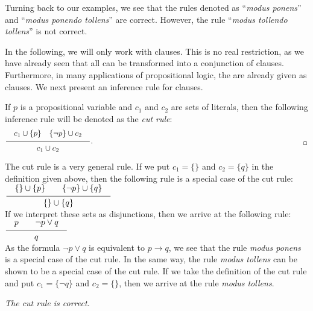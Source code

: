 Turning back to our examples, we see that the rules denoted as
``\emph{modus ponens}'' and ``\emph{modus ponendo tollens}'' are correct.  However, the rule
``\emph{modus tollendo tollens}'' is not correct.

In the following, we will only work with clauses.  This is no real restriction, as we have
already seen that all \formulae can be transformed into a conjunction of clauses.
Furthermore, in many applications of propositional logic, the \formulae are already given 
as clauses.  We next present an inference rule for clauses.

\begin{Definition}
If $p$ is a propositional variable and $c_1$ and $c_2$ are sets of literals, then the
following inference rule will be denoted as the \emph{cut rule}: 
\[ \schluss{ c_1 \cup \{p\} \quad \{\neg p\} \cup c_2 }{c_1 \cup c_2}. 
   \hspace*{9.4cm} _\Box 
\]
\end{Definition}

\noindent
The cut rule is a very general rule.  If we put $c_1 =
\{\}$ and  $c_2 = \{q\}$ in the definition given above,
then the following rule is a special case of the cut rule: 
\\[0.2cm]
\hspace*{1.3cm} 
$\schluss{\{\} \cup \{p\} \quad\quad \{\neg p\} \cup \{ q \} }{ \{\} \cup \{q\} }$ 
\\[0.2cm]
If we interpret these sets as disjunctions, then we arrive at the following rule: 
\\[0.2cm]
\hspace*{1.3cm} 
$\schluss{p \quad\quad \neg p \vee q }{ q }$
\\[0.2cm]
As the formula $\neg p \vee q$ is equivalent to  $p \rightarrow q$, we see that the rule
\emph{modus ponens} is a special case of the cut rule.  
In the same way, the rule \emph{modus tollens} can be shown to be a special case of the
cut rule.  If we take the definition of the cut rule and put $c_1 = \{ \neg q \}$ and $c_2 = \{\}$, 
then we arrive at the rule \emph{modus tollens}. 

\begin{Proposition}
{\em
  The cut rule is correct.
}
\end{Proposition}

